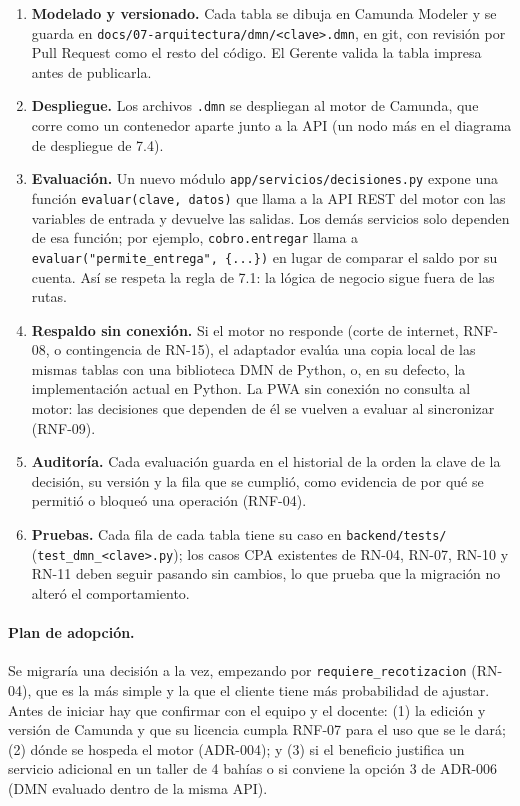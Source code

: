\begin{enumerate}
\tightlist
\item \textbf{Modelado y versionado.} Cada tabla se dibuja en Camunda Modeler y se guarda en
\texttt{docs/07-arquitectura/dmn/<clave>.dmn}, en git, con revisión por Pull Request como el resto del
código. El Gerente valida la tabla impresa antes de publicarla.
\item \textbf{Despliegue.} Los archivos \texttt{.dmn} se despliegan al motor de Camunda, que corre como un
contenedor aparte junto a la API (un nodo más en el diagrama de despliegue de 7.4).
\item \textbf{Evaluación.} Un nuevo módulo \texttt{app/servicios/decisiones.py} expone una función
\texttt{evaluar(clave, datos)} que llama a la API REST del motor con las variables de entrada y devuelve
las salidas. Los demás servicios solo dependen de esa función; por ejemplo, \texttt{cobro.entregar} llama
a \texttt{evaluar("permite\_entrega", \{...\})} en lugar de comparar el saldo por su cuenta. Así se respeta
la regla de 7.1: la lógica de negocio sigue fuera de las rutas.
\item \textbf{Respaldo sin conexión.} Si el motor no responde (corte de internet, RNF-08, o contingencia
de RN-15), el adaptador evalúa una copia local de las mismas tablas con una biblioteca DMN de Python, o, en
su defecto, la implementación actual en Python. La PWA sin conexión no consulta al motor: las decisiones
que dependen de él se vuelven a evaluar al sincronizar (RNF-09).
\item \textbf{Auditoría.} Cada evaluación guarda en el historial de la orden la clave de la decisión, su
versión y la fila que se cumplió, como evidencia de por qué se permitió o bloqueó una operación
(RNF-04).
\item \textbf{Pruebas.} Cada fila de cada tabla tiene su caso en \texttt{backend/tests/}
(\texttt{test\_dmn\_<clave>.py}); los casos CPA existentes de RN-04, RN-07, RN-10 y RN-11 deben seguir
pasando sin cambios, lo que prueba que la migración no alteró el comportamiento.
\end{enumerate}

\paragraph{Plan de adopción.} Se migraría una decisión a la vez, empezando por \texttt{requiere\_recotizacion}
(RN-04), que es la más simple y la que el cliente tiene más probabilidad de ajustar. Antes de iniciar hay
que confirmar con el equipo y el docente: (1) la edición y versión de Camunda y que su licencia cumpla
RNF-07 para el uso que se le dará; (2) dónde se hospeda el motor (ADR-004); y (3) si el beneficio justifica
un servicio adicional en un taller de 4 bahías o si conviene la opción 3 de ADR-006 (DMN evaluado dentro de
la misma API).

